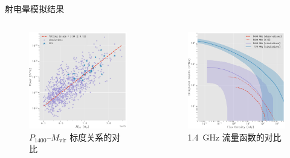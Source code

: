 \documentclass{beamer}
\newcommand{\R}[1]{\text{#1}}  %
\begin{document}
\begin{frame}{射电晕模拟结果}
  \begin{columns}
    \begin{figure}
      \centering
      \includegraphics[width=\columnwidth]{halo-power-mvir}
      \caption{$P_{1400}$--$M_{\R{vir}}$ 标度关系的对比}
    \end{figure}

    \begin{figure}
      \centering
      \includegraphics[width=\columnwidth]{fluxfunc-simucomp}
      \caption{\SI{1.4}{\GHz} 流量函数的对比}
    \end{figure}
  \end{columns}
\end{frame}
\end{document}
